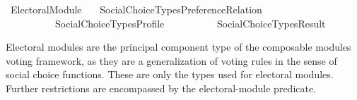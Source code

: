 %
\begin{isabellebody}%
%
%
\isadelimdocument
\isanewline
%
\endisadelimdocument
%
\isatagdocument
\isanewline
\isanewline
\isanewline
%
\isamarkuptrue%
%
\isamarkuptrue%
%
\endisatagdocument
{\isafolddocument}%
%
\isadelimdocument
%
\endisadelimdocument
%
\isadelimtheory
%
\endisadelimtheory
%
\isatagtheory
{}\isamarkupfalse%
\ Electoral{\isacharunderscore}{\kern0pt}Module\isanewline
\ \ \ {\isachardoublequoteopen}{\isachardot}{\kern0pt}{\isachardot}{\kern0pt}{\isacharslash}{\kern0pt}{\isachardot}{\kern0pt}{\isachardot}{\kern0pt}{\isacharslash}{\kern0pt}Social{\isacharunderscore}{\kern0pt}Choice{\isacharunderscore}{\kern0pt}Types{\isacharslash}{\kern0pt}Preference{\isacharunderscore}{\kern0pt}Relation{\isachardoublequoteclose}\isanewline
\ \ \ \ \ \ \ \ \ \ {\isachardoublequoteopen}{\isachardot}{\kern0pt}{\isachardot}{\kern0pt}{\isacharslash}{\kern0pt}{\isachardot}{\kern0pt}{\isachardot}{\kern0pt}{\isacharslash}{\kern0pt}Social{\isacharunderscore}{\kern0pt}Choice{\isacharunderscore}{\kern0pt}Types{\isacharslash}{\kern0pt}Profile{\isachardoublequoteclose}\isanewline
\ \ \ \ \ \ \ \ \ \ {\isachardoublequoteopen}{\isachardot}{\kern0pt}{\isachardot}{\kern0pt}{\isacharslash}{\kern0pt}{\isachardot}{\kern0pt}{\isachardot}{\kern0pt}{\isacharslash}{\kern0pt}Social{\isacharunderscore}{\kern0pt}Choice{\isacharunderscore}{\kern0pt}Types{\isacharslash}{\kern0pt}Result{\isachardoublequoteclose}\isanewline
\isanewline
{}%
\endisatagtheory
{\isafoldtheory}%
%
\isadelimtheory
%
\endisadelimtheory
%
\begin{isamarkuptext}%
Electoral modules are the principal component type of the composable modules
voting framework, as they are a generalization of voting rules in the sense of
social choice functions.
These are only the types used for electoral modules. Further restrictions are
encompassed by the electoral-module predicate.


\end{isamarkuptext}
\end{isabellebody}

